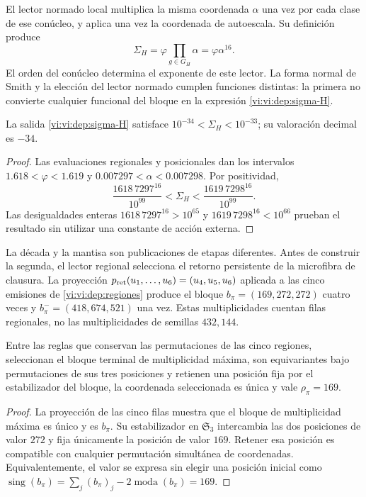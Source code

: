 El lector normado local multiplica la misma coordenada \(\alpha\)
una vez por cada clase de ese conúcleo, y aplica una vez la coordenada
de autoescala. Su definición produce
\begin{equation}
 \Sigma_H=\varphi\prod_{g\in G_H}\alpha
         =\varphi\alpha^{16}.
 \label{vi:vi:dep:sigma-H}
\end{equation}
El orden del conúcleo determina el exponente de este lector. La forma
normal de Smith y la elección del lector normado cumplen funciones
distintas: la primera no convierte cualquier funcional del bloque en
la expresión \eqref{vi:vi:dep:sigma-H}.

\begin{proposition}
\label{vi:vi:dep:decada}
La salida \eqref{vi:vi:dep:sigma-H} satisface
\(10^{-34}<\Sigma_H<10^{-33}\); su valoración decimal es \(-34\).
\end{proposition}
\begin{proof}
Las evaluaciones regionales y posicionales dan los intervalos
\(1.618<\varphi<1.619\) y \(0.007297<\alpha<0.007298\).
Por positividad,
\[
 \frac{1618\,7297^{16}}{10^{99}}
 <\Sigma_H<
 \frac{1619\,7298^{16}}{10^{99}}.
\]
Las desigualdades enteras
\(1618\,7297^{16}>10^{65}\) y
\(1619\,7298^{16}<10^{66}\) prueban el resultado sin utilizar una
constante de acción externa.
\end{proof}

La década y la mantisa son publicaciones de etapas diferentes.
Antes de construir la segunda, el lector regional selecciona el retorno
persistente de la microfibra de clausura. La proyección
\(p_{\rm ret}(u_1,\ldots,u_6)=(u_4,u_5,u_6)\) aplicada a las
cinco emisiones de \ref{vi:vi:dep:regiones} produce el bloque
\(b_\pi=(169,272,272)\) cuatro veces y
\(b_\pi^-=(418,674,521)\) una vez. Estas multiplicidades cuentan
filas regionales, no las multiplicidades de semillas \(432,144\).

\begin{proposition}
\label{vi:vi:dep:selector169}
Entre las reglas que conservan las permutaciones de las cinco regiones,
seleccionan el bloque terminal de multiplicidad máxima, son equivariantes
bajo permutaciones de sus tres posiciones y retienen una posición fija
por el estabilizador del bloque, la coordenada seleccionada es única
y vale \(\rho_\pi=169\).
\end{proposition}
\begin{proof}
La proyección de las cinco filas muestra que el bloque de multiplicidad
máxima es único y es \(b_\pi\). Su estabilizador en
\(\mathfrak S_3\) intercambia las dos posiciones de valor \(272\)
y fija únicamente la posición de valor \(169\). Retener esa posición
es compatible con cualquier permutación simultánea de coordenadas.
Equivalentemente, el valor se expresa sin elegir una posición inicial
como
\(\operatorname{sing}(b_\pi)=\sum_j(b_\pi)_j
-2\operatorname{moda}(b_\pi)=169\).
\end{proof}

